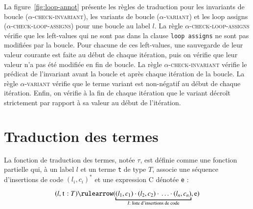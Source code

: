 

La figure~\ref{fig:loop-annot} présente les règles de traduction pour les
invariants de boucle (\textsc{$\alpha$-check-invariant}), les variants de boucle
(\textsc{$\alpha$-variant}) et les loop assigns
(\textsc{$\alpha$-check-loop-assigns}) pour une boucle au label $l$.
La règle \textsc{$\alpha$-check-loop-assigns} vérifie que les left-values qui ne
sont pas dans la clause \lstinline'loop assigns' ne sont pas modifiées par la
boucle.
Pour chacune de ces left-values, une sauvegarde de leur valeur courante est
faite au début de chaque itération, puis on vérifie que leur valeur n'a pas été
modifiée en fin de boucle.
La règle \textsc{$\alpha$-check-invariant} vérifie le prédicat de l'invariant
avant la boucle et après chaque itération de la boucle.
La règle \textsc{$\alpha$-variant} vérifie que le terme variant est non-négatif
au début de chaque itération.
Enfin, on vérifie à la fin de chaque itération que le variant décroît
strictement par rapport à sa valeur au début de l'itération.



\section{Traduction des termes \eacsl}
\label{sec:term}


La fonction de traduction des termes, notée $\tau$, est définie comme une
fonction partielle qui, à un label $l$ et un terme \lstinline't' de type $T$,
associe une séquence d'insertions de code $(l_i, c_i)^*$ et une expression C
dénotée \lstinline'e' :

\[
(l, \mbox{\lstinline't'}:T) \rulearrow
(\underbracket{(l_1, c_1) \concat (l_2, c_2) \concat \ldots
  \concat (l_n, c_n)}_{I : \text{ liste d'insertions de code}}, \mbox{\lstinline'e'})
\]

